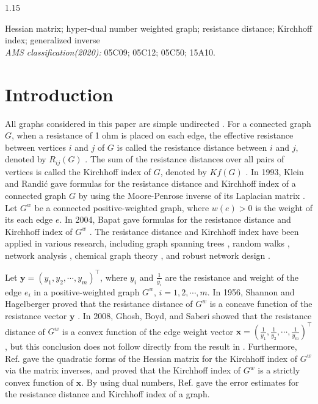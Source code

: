 \documentclass[preprint,12pt]{elsarticle1}
\numberwithin{equation}{section}
\begin{document}
\begin{spacing}{1.15}
\begin{frontmatter}
\begin{keyword} Hessian matrix; hyper-dual number weighted  graph; resistance distance; Kirchhoff index;  generalized inverse \\
\emph{AMS classification(2020):} 05C09; 05C12; 05C50; 15A10.
\end{keyword}

\end{frontmatter}

\section{Introduction}

All graphs considered in this paper are simple undirected \cite{harary1969graph}. For a connected graph $G$, when a resistance
 of 1 ohm is placed on each edge, the effective resistance between vertices $i$ and $j$ of $G$
is called the resistance distance between $i$ and $j$, denoted by $R_{ij}(G)$ \cite{foster1949average}. The sum of the resistance distances over all pairs of vertices is called the Kirchhoff index of $G$, denoted by $Kf(G)$ \cite{chen2008resistance}. In 1993, Klein and Randi\'{c} gave formulas for the resistance distance and Kirchhoff index of a connected graph $G$ by using the Moore-Penrose inverse of its Laplacian matrix \cite{Klein1993Resistance}.
Let $G^{w}$ be a connected positive-weighted graph, where $w(e)>0$ is the weight of its each edge $e$. %
In 2004, Bapat gave formulas for the resistance distance and Kirchhoff index of $G^{w}$ \cite{bapat2004resistance}. The resistance distance and Kirchhoff index have been applied in various research, including graph spanning trees \cite{cheng2022counting,li2019enumeration}, random walks \cite{lovasz1993random,cloninger2024random}, network analysis \cite{zhang2019detecting}, chemical graph theory \cite{bonchev1994molecular}, and robust network design \cite{yang2018designing,ellens2011effective}.

Let $\textbf{y}=(y_{1},y_{2},\cdots,y_{m})^{\top}$, where  $y_{i}$ and $\frac{1}{y_{i}}$ are the resistance  and   weight of the edge  $e_{i}$ in a positive-weighted graph $G^{w}$, $i=1,2,\cdots,m.$ In 1956, Shannon and Hagelberger proved that the resistance distance of $G^{w}$ is a concave function of the resistance vector $\textbf{y}$ \cite{shannon1993concavity}. In 2008, Ghosh, Boyd, and Saberi showed that the resistance distance of $G^{w}$ is a convex function of the edge weight vector $\textbf{x}=(\frac{1}{y_{1}},\frac{1}{y_{2}},\cdots,\frac{1}{y_{m}})^{\top}$ \cite{ghosh2008minimizing}, but this conclusion does not follow directly from the result in \cite{shannon1993concavity}. Furthermore, Ref. \cite{ghosh2008minimizing} gave the quadratic forms of the Hessian matrix for the Kirchhoff index of $G^{w}$ via the  matrix inverses, and proved that the Kirchhoff index of $G^{w}$ is a strictly convex function of $\textbf{x}$.  By using dual numbers, Ref. \cite{li2025resistance} gave the error estimates for the resistance distance and Kirchhoff index of a graph.


\end{spacing}
\end{document}
